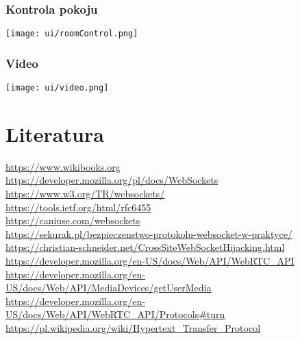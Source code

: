 \documentclass{article}
\begin{document}
\subsubsection{Kontrola pokoju}
\texttt{[image: ui/roomControl.png]}

\subsubsection{Video}
\texttt{[image: ui/video.png]}

\section{Literatura}

\url{https://www.wikibooks.org}\\
\url{https://developer.mozilla.org/pl/docs/WebSockets}\\
\url{https://www.w3.org/TR/websockets/}\\
\url{https://tools.ietf.org/html/rfc6455}\\
\url{https://caniuse.com/websockets}\\
\url{https://sekurak.pl/bezpieczenstwo-protokolu-websocket-w-praktyce/}\\
\url{https://christian-schneider.net/CrossSiteWebSocketHijacking.html}\\
\url{https://developer.mozilla.org/en-US/docs/Web/API/WebRTC_API}\\
\url{https://developer.mozilla.org/en-US/docs/Web/API/MediaDevices/getUserMedia}\\
\url{https://developer.mozilla.org/en-US/docs/Web/API/WebRTC_API/Protocols#turn}\\
\url{https://pl.wikipedia.org/wiki/Hypertext_Transfer_Protocol}
\end{document}
